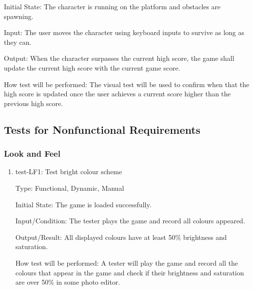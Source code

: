 \documentclass[12pt, titlepage]{article}
\begin{document}
\begin{enumerate}
Initial State: The character is running on the platform and obstacles are spawning.
					
Input: The user moves the character using keyboard inputs to survive as long as they can.
					
Output: When the character surpasses the current high score, the game shall update the current high score with the current game score.
					
How test will be performed: The visual test will be used to confirm when that the high score is updated once the user achieves a current score higher than the previous high score.

\end{enumerate}			

\subsection{Tests for Nonfunctional Requirements}

\subsubsection{Look and Feel}
\begin{enumerate}

\item{test-LF1: Test bright colour scheme\\}

Type: Functional, Dynamic, Manual
					
Initial State: The game is loaded successfully.
					
Input/Condition: The tester plays the game and record all colours appeared.
					
Output/Result: All displayed colours have at least 50\% brightness and saturation.  
					
How test will be performed: A tester will play the game and record all the colours that appear in the game and check if their brightness and saturation are over 50\% in some photo editor.

\end{enumerate}
\end{document}
